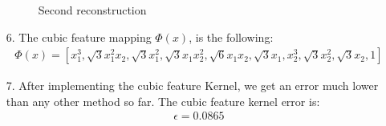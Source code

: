 \documentclass[letterpaper, 12pt]{article}
\begin{document}
\begin{enumerate}
\begin{figure}[!ht]
        \hfill
        \caption{Second reconstruction}
        \end{figure}

\clearpage

     
    \item[6.] The cubic feature mapping $\Phi(x)$, is the following:
    \begin{align*}
        \Phi(x)=[x_1^3, \sqrt3x_1^2x_2, \sqrt3x_1^2, \sqrt3x_1x_2^2, \sqrt6x_1x_2, \sqrt3x_1, x_2^3, \sqrt3x_2^2, \sqrt3x_2, 1]
    \end{align*}
    \item[7.] After implementing the cubic feature Kernel, we get an error much lower than any other method so far. The cubic feature kernel error is:
    \begin{align*}
        \epsilon=0.0865
    \end{align*}
 
\end{enumerate}
\vspace{3mm}
\end{document}
